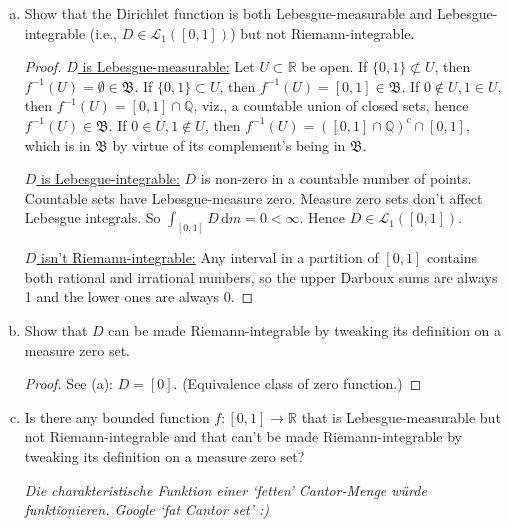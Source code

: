 \documentclass[10pt]{article}\usepackage[]{graphicx}\usepackage[]{color}
\newcommand{\Q}{\mathbb{Q}}
\newcommand{\R}{\mathbb{R}}
\newcommand{\df}{\,\textrm{d}}
\begin{document}
\begin{enumerate}[(a)]
\item Show that the Dirichlet function is both Lebesgue-measurable
and Lebesgue-integrable (i.e., $D \in \mathcal{L}_1([0,1])$)
but not Riemann-integrable.
  \begin{proof}
    \uline{$D$ is Lebesgue-measurable:}
    Let $U \subset \R$ be open.
    If $\{0,1\} \not \subset U$, then $f^{-1}(U) = \emptyset \in \mathfrak{B}$.
    If $\{0,1\} \subset U$, then $f^{-1}(U) = [0,1] \in \mathfrak{B}$.
    If $0 \notin U, 1 \in U$, then $f^{-1}(U) = [0,1] \cap \Q$, viz., a countable 
    union of closed sets, hence $f^{-1}(U) \in \mathfrak{B}$.
    If $0 \in U, 1 \not \in U$, then $f^{-1}(U) = ([0,1] \cap \Q)^c \cap [0,1]$, which is in $\mathfrak{B}$
    by virtue of its complement's being in $\mathfrak{B}$.
    
    \uline{$D$ is Lebesgue-integrable:}
    $D$ is non-zero in a countable number of points. 
    Countable sets have Lebesgue-measure zero.
    Measure zero sets don't affect Lebesgue integrals.
    So $\int_{[0,1]} D \df m = 0 < \infty$. Hence $D \in \mathcal{L}_1([0,1])$.
    
    \uline{$D$ isn't Riemann-integrable:}
    Any interval in a partition of $[0,1]$ contains both rational and irrational numbers,
    so the upper Darboux sums are always 1 and the lower ones are always 0.
  \end{proof}
  
\item Show that $D$ can be made Riemann-integrable by tweaking its definition on a measure zero set.
  \begin{proof}
  See (a): $D = [0]$. (Equivalence class of zero function.)
  \end{proof}
  
\item Is there any bounded function $f: [0,1] \to \R$ that is Lebesgue-measurable
but not Riemann-integrable and that can't be made Riemann-integrable by tweaking its
definition on a measure zero set?

\textit{Die charakteristische Funktion einer `fetten' Cantor-Menge würde funktionieren. Google `fat Cantor set' :)}
\end{enumerate}
\end{document}
